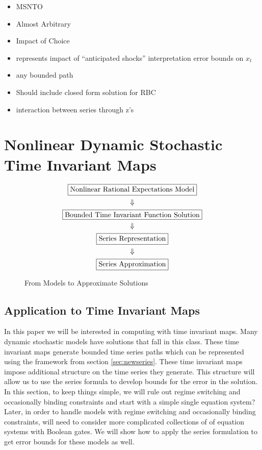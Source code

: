 \documentclass[12pt]{article}
\begin{document}
\begin{itemize}
\item MSNTO
\item Almost Arbitrary
\item Impact of Choice
\item represents impact of ``anticipated shocks'' interpretation error bounds on $x_t$
\item any bounded path
\item Should include closed form solution for RBC
\item interaction between series  through z's
\end{itemize}


\section{Nonlinear Dynamic Stochastic Time Invariant Maps}
\label{sec:extToMaps}

\begin{figure}
  \centering
  


  \begin{gather}
    \fbox{Nonlinear Rational Expectations Model}\\ \Downarrow\\
\fbox{Bounded Time Invariant Function Solution}\\\Downarrow\\
\fbox{Series Representation}\\\Downarrow\\
\fbox{Series Approximation}
  \end{gather}
  \caption{From Models to Approximate Solutions}
  \label{fig:modelsto}
\end{figure}



\subsection{Application to Time Invariant Maps}


In this paper we will be interested in computing with time
 invariant maps. Many dynamic stochastic models have solutions that fall in this class. 
These time invariant maps generate  bounded time series paths which can
be represented using the framework from section \ref{sec:newseries}.
These time invariant maps impose additional structure on the time 
series they generate.  This structure will allow us to use the series formula to
develop bounds for the error in the solution.
In this section, to keep things simple, we will rule out regime switching and occasionally binding constraints and start
 with  a simple single equation system?
Later, in order to handle models with regime switching and occasionally binding constraints, will need to consider more complicated collections of 
of equation systems with  Boolean gates. We will show how to apply the 
series formulation to get error bounds for these models as well.
\end{document}
